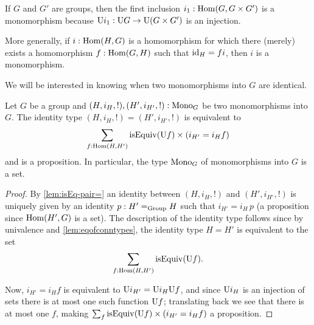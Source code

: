 \begin{example}
  \label{ex:prodinclismono}
  If $G$ and $G'$ are groups, then the first inclusion $i_1:\Hom(G,G\times G')$ is a monomorphism because $\mathrm{U} i_1:\mathrm{U} G\to \mathrm{U}(G\times G')$ is an injection.

  More generally, if $i:\Hom(H,G)$ is a homomorphism for which there (merely) exists a homomorphism $f:\Hom(G,H)$ such that $\mathord{\mathrm{id}}_H=fi$, then $i$ is a monomorphism.
  \end{example}

We will be interested in knowing when two monomorphisms into $G$ are identical.

\begin{lemma}
  \label{lem:setofsubgroups}
  Let $G$ be a group and $(H,i_H,!),(H',i_{H'},!):\mathrm{Mono}_G$ be two monomorphisms into $G$.  The identity type $(H,i_H,!)=(H',i_{H'},!)$ is equivalent to
  $$\sum_{f:\Hom(H,H')}\isEq(\US f)\times (i_{H'}=i_H f)$$ and is a proposition.
  In particular, the type $\mathrm{Mono}_G$ of monomorphisms into $G$ is a set.
\end{lemma}
\begin{proof}
By \cref{lem:isEq-pair=} an identity between $(H,i_H,!)$ and $(H',i_{H'},!)$ is uniquely given by an identity $p:H'=_{\mathrm{Group}}H$ such that $i_{H'}=i_H\,p$ (a proposition since $\Hom(H',G)$ is a set).
  The description of the identity type follows since by univalence and \cref{lem:eqofconntypes}, the identity type $H=H'$ is equivalent to the set
$$\sum_{f:\Hom(H,H')}\isEq(\US f).$$

Now, $i_{H'}=i_Hf$ is equivalent to $\mathrm{U} i_{H'}=\mathrm{U} i_H \mathrm{U} f$, and since $\mathrm{U} i_H$ is an injection of sets there is at most one such function $\mathrm{U} f$; translating back we see that there is at most one $f$, making $\sum_{f%
}\isEq(\US f)\times (i_{H'}=i_H f)$ a proposition.
\end{proof}

